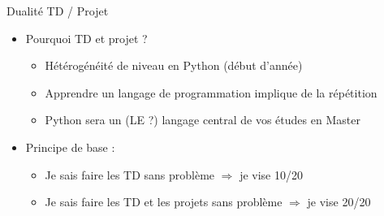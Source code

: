\documentclass[10pt]{beamer}
\begin{document}
\begin{frame}{Dualité TD / Projet}  
  \begin{itemize}
    \item Pourquoi TD \alert{et} projet ?
    \begin{itemize}
      \item Hétérogénéité de niveau en Python (début d'année)
      \item Apprendre un langage de programmation implique de la répétition
      \item Python sera un (LE ?) langage central de vos études en Master
    \end{itemize}
    \item Principe de base :
    \begin{itemize}
        \item Je sais faire les TD sans problème $\Rightarrow$ je vise 10/20
        \item Je sais faire les TD et les projets sans problème $\Rightarrow$ je vise 20/20
    \end{itemize}  
  \end{itemize}
\end{frame}






  
  
    
\end{document}
